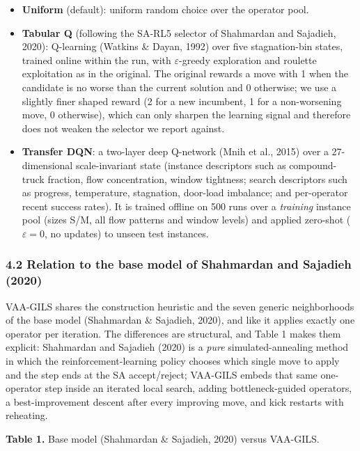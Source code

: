 \documentclass[
]{article}
\providecommand{\tightlist}{%
  \setlength{\itemsep}{0pt}\setlength{\parskip}{0pt}}
\begin{document}
\begin{itemize}
\tightlist
\item
  \textbf{Uniform} (default): uniform random choice over the operator
  pool.
\item
  \textbf{Tabular Q} (following the SA-RL5 selector of Shahmardan and
  Sajadieh, 2020): Q-learning (Watkins \& Dayan, 1992) over five
  stagnation-bin states, trained online within the run, with
  \(\varepsilon\)-greedy exploration and roulette exploitation as in the
  original. The original rewards a move with 1 when the candidate is no
  worse than the current solution and 0 otherwise; we use a slightly
  finer shaped reward (2 for a new incumbent, 1 for a non-worsening move,
  0 otherwise), which can only sharpen the learning signal and therefore
  does not weaken the selector we report against.
\item
  \textbf{Transfer DQN}: a two-layer deep Q-network (Mnih et al., 2015)
  over a 27-dimensional scale-invariant state (instance descriptors such
  as compound-truck fraction, flow concentration, window tightness;
  search descriptors such as progress, temperature, stagnation,
  door-load imbalance; and per-operator recent success rates). It is
  trained offline on 500 runs over a \emph{training} instance pool
  (sizes S/M, all flow patterns and window levels) and applied zero-shot
  (\(\varepsilon=0\), no updates) to unseen test instances.
\end{itemize}

\subsubsection{4.2 Relation to the base model of Shahmardan and Sajadieh
(2020)}\label{relation-to-the-base-model-of-shahmardan-and-sajadieh-2020}

VAA-GILS shares the construction heuristic and the seven generic
neighborhoods of the base model (Shahmardan \& Sajadieh, 2020), and like
it applies exactly one operator per iteration. The differences are
structural, and Table 1 makes them explicit: Shahmardan and Sajadieh
(2020) is a \emph{pure} simulated-annealing method in which the
reinforcement-learning policy chooses which single move to apply and the
step ends at the SA accept/reject; VAA-GILS embeds that same
one-operator step inside an iterated local search, adding
bottleneck-guided operators, a best-improvement descent after every
improving move, and kick restarts with reheating.

\textbf{Table 1.} Base model (Shahmardan \& Sajadieh, 2020) versus
VAA-GILS.
\end{document}

